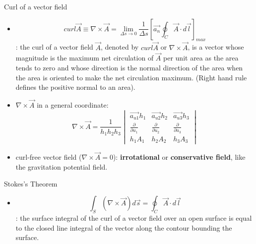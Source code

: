 \documentclass[xcolor={dvipsnames}]{beamer}
\begin{document}
\begin{frame}{Curl of a vector field}
\begin{itemize}
    \item $$curl \vec{A}\equiv\nabla\times\vec{A}=\lim_{\Delta s\to 0}\frac{1}{\Delta s}[\vec{a_n}\oint_{C}\vec{A}\cdot d\vec{l}]_{max}$$: the curl of a vector field $\vec{A}$, denoted by $curl\vec{A}$ or $\nabla\times\vec{A}$, is a vector whose magnitude is the maximum net circulation of $\vec{A}$ per unit area as the area tends to zero and whose direction is the normal direction of the area when the area is oriented to make the net circulation maximum. (Right hand rule defines the positive normal to an area).
    \item $\nabla\times\vec{A}$ in a general coordinate:
    $$
    \nabla\times\vec{A}=\frac{1}{h_1h_2h_3}\begin{vmatrix}
        \vec{a_{u1}}h_1 & \vec{a_{u2}}h_2 &\vec{a_{u3}}h_3\\
        \frac{\partial}{\partial u_1} & \frac{\partial}{\partial u_2} &\frac{\partial}{\partial u_3}\\
        h_1A_1 & h_2A_2 & h_3A_3
    \end{vmatrix}
    $$
    \item curl-free vector field ($\nabla\times\vec{A}=0$): \textbf{irrotational} or \textbf{conservative field}, like the gravitation potential field.
\end{itemize}
\end{frame}
\begin{frame}{Stokes's Theorem}
\begin{itemize}
    \item $$\int_S(\nabla\times\vec{A})d\vec{s}=\oint_C\vec{A}\cdot d\vec{l}$$: the surface integral of the curl of a vector field over an open surface is equal to the closed line integral of the vector along the contour bounding the surface.
\end{itemize}
\end{frame}
\end{document}
